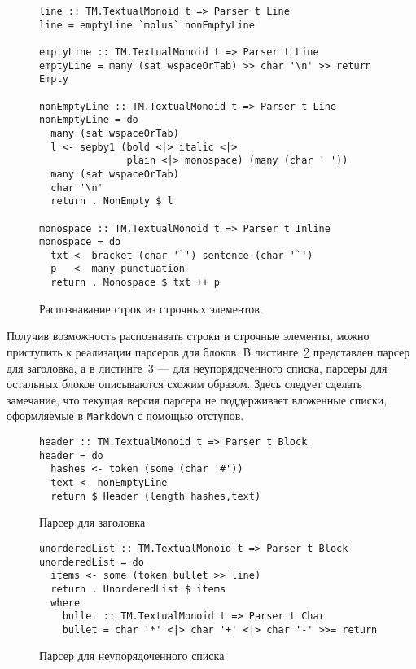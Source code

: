 \begin{figure}[t]
\begin{lstlisting}
line :: TM.TextualMonoid t => Parser t Line
line = emptyLine `mplus` nonEmptyLine

emptyLine :: TM.TextualMonoid t => Parser t Line
emptyLine = many (sat wspaceOrTab) >> char '\n' >> return Empty

nonEmptyLine :: TM.TextualMonoid t => Parser t Line
nonEmptyLine = do
  many (sat wspaceOrTab)
  l <- sepby1 (bold <|> italic <|>
               plain <|> monospace) (many (char ' '))
  many (sat wspaceOrTab)
  char '\n'
  return . NonEmpty $ l

monospace :: TM.TextualMonoid t => Parser t Inline
monospace = do
  txt <- bracket (char '`') sentence (char '`')
  p   <- many punctuation
  return . Monospace $ txt ++ p
\end{lstlisting}
\caption{Распознавание строк из строчных элементов.}
\label{listing:MarkdownInline}
\end{figure}

Получив возможность распознавать строки и строчные элементы, можно приступить к реализации парсеров для блоков. В листинге~\ref{listing:MarkdownHeader} представлен парсер для заголовка, а в листинге~\ref{listing:markdownUlist} --- для неупорядоченного списка, парсеры для остальных блоков описываются схожим образом. Здесь следует сделать замечание, что текущая версия парсера не поддерживает вложенные списки, оформляемые в \lstinline{Markdown} с помощью отступов.

\begin{figure}[t]
\begin{lstlisting}
header :: TM.TextualMonoid t => Parser t Block
header = do
  hashes <- token (some (char '#'))
  text <- nonEmptyLine
  return $ Header (length hashes,text)
\end{lstlisting}
\caption{Парсер для заголовка}
\label{listing:MarkdownHeader}
\end{figure}

\begin{figure}[t]
\begin{lstlisting}
unorderedList :: TM.TextualMonoid t => Parser t Block
unorderedList = do
  items <- some (token bullet >> line)
  return . UnorderedList $ items
  where
    bullet :: TM.TextualMonoid t => Parser t Char
    bullet = char '*' <|> char '+' <|> char '-' >>= return
\end{lstlisting}
\caption{Парсер для неупорядоченного списка}
\label{listing:markdownUlist}
\end{figure}

